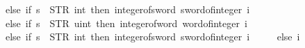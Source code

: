 \begin{isabellebody}
\ \ \ \ \ else\ if\ s\ {\isacharequal}{\kern0pt}\ STR\ {\isacharprime}{\kern0pt}{\isacharprime}{\kern0pt}int{}{}{\isacharprime}{\kern0pt}{\isacharprime}{\kern0pt}\ then\ integer{\isacharunderscore}{\kern0pt}of{\isacharunderscore}{\kern0pt}sword{}{}\ {\isacharparenleft}{\kern0pt}sword{}{}{\isacharunderscore}{\kern0pt}of{\isacharunderscore}{\kern0pt}integer\ i{\isacharparenright}{\kern0pt}\isanewline
\ \ \ \ \ else\ if\ s\ {\isacharequal}{\kern0pt}\ STR\ {\isacharprime}{\kern0pt}{\isacharprime}{\kern0pt}uint{}{}{\isacharprime}{\kern0pt}{\isacharprime}{\kern0pt}\ then\ integer{\isacharunderscore}{\kern0pt}of{\isacharunderscore}{\kern0pt}word{}{}\ {\isacharparenleft}{\kern0pt}word{}{}{\isacharunderscore}{\kern0pt}of{\isacharunderscore}{\kern0pt}integer\ i{\isacharparenright}{\kern0pt}\isanewline
\ \ \ \ \ else\ if\ s\ {\isacharequal}{\kern0pt}\ STR\ {\isacharprime}{\kern0pt}{\isacharprime}{\kern0pt}int{}{}{\isacharprime}{\kern0pt}{\isacharprime}{\kern0pt}\ then\ integer{\isacharunderscore}{\kern0pt}of{\isacharunderscore}{\kern0pt}sword{}{}\ {\isacharparenleft}{\kern0pt}sword{}{}{\isacharunderscore}{\kern0pt}of{\isacharunderscore}{\kern0pt}integer\ i{\isacharparenright}{\kern0pt}\isanewline
\ \ \ \ \ else\ i{\isachardoublequoteclose}\isanewline
%
\isadelimtheory
\isanewline
%
\endisadelimtheory
%
\isatagtheory
{}\isamarkupfalse%
%
\endisatagtheory
{\isafoldtheory}%
%
\isadelimtheory
%
\endisadelimtheory
%
\end{isabellebody}%
\endinput
